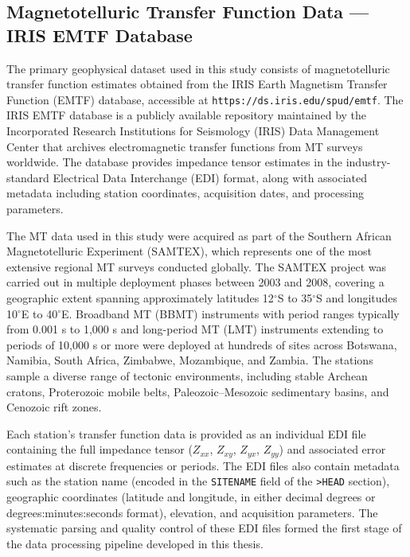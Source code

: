 \subsection*{Magnetotelluric Transfer Function Data --- IRIS EMTF Database}

The primary geophysical dataset used in this study consists of magnetotelluric transfer function estimates obtained from the IRIS Earth Magnetism Transfer Function (EMTF) database, accessible at \texttt{https://ds.iris.edu/spud/emtf}. The IRIS EMTF database is a publicly available repository maintained by the Incorporated Research Institutions for Seismology (IRIS) Data Management Center that archives electromagnetic transfer functions from MT surveys worldwide. The database provides impedance tensor estimates in the industry-standard Electrical Data Interchange (EDI) format, along with associated metadata including station coordinates, acquisition dates, and processing parameters.

The MT data used in this study were acquired as part of the Southern African Magnetotelluric Experiment (SAMTEX), which represents one of the most extensive regional MT surveys conducted globally. The SAMTEX project was carried out in multiple deployment phases between 2003 and 2008, covering a geographic extent spanning approximately latitudes 12$^\circ$S to 35$^\circ$S and longitudes 10$^\circ$E to 40$^\circ$E. Broadband MT (BBMT) instruments with period ranges typically from 0.001 s to 1{,}000 s and long-period MT (LMT) instruments extending to periods of 10{,}000 s or more were deployed at hundreds of sites across Botswana, Namibia, South Africa, Zimbabwe, Mozambique, and Zambia. The stations sample a diverse range of tectonic environments, including stable Archean cratons, Proterozoic mobile belts, Paleozoic--Mesozoic sedimentary basins, and Cenozoic rift zones.

Each station's transfer function data is provided as an individual EDI file containing the full impedance tensor ($Z_{xx}$, $Z_{xy}$, $Z_{yx}$, $Z_{yy}$) and associated error estimates at discrete frequencies or periods. The EDI files also contain metadata such as the station name (encoded in the \texttt{SITENAME} field of the \texttt{>HEAD} section), geographic coordinates (latitude and longitude, in either decimal degrees or degrees:minutes:seconds format), elevation, and acquisition parameters. The systematic parsing and quality control of these EDI files formed the first stage of the data processing pipeline developed in this thesis.

